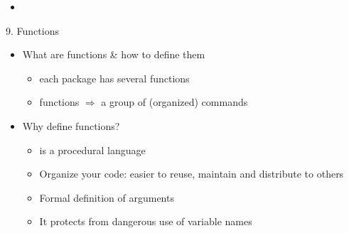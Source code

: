 \documentclass[14pt, aspectratio=169, sectionpage=simple, xclolor=table]{beamer}
\begin{document}


\begin{frame}[lbslide]{}
\begin{itemize}
\item {}
\end{itemize}

\end{frame}
\begin{frame}{9. Functions}
\begin{itemize}
\item What are functions \& how to define them
\begin{itemize}
\item each package has several functions
\item functions $\Rightarrow$ a group of (organized) \R commands
\nl
\end{itemize}
\item Why define functions?
\begin{itemize}
\item \R is a procedural language
\item Organize your code: easier to reuse, maintain and distribute to others
\item Formal definition of arguments
\item It protects from dangerous use of variable names
\nl
\end{itemize}
\end{itemize}
\end{frame}
\end{document}
